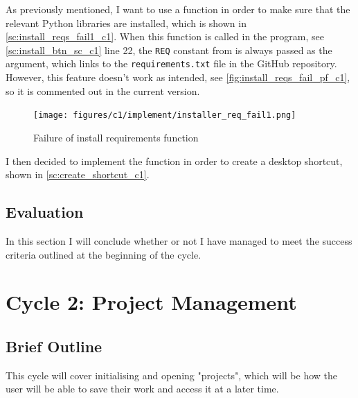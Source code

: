 \documentclass[11pt]{article}
\begin{document}
            As previously mentioned, I want to use a function in order to make sure that the relevant Python libraries are installed, which is shown in \autoref{sc:install_reqs_fail1_c1}. 
            When this function is called in the program, see \autoref{sc:install_btn_sc_c1} line 22, the \verb|REQ| constant from is always passed as the argument, which links to the \verb|requirements.txt| file in the GitHub repository. However, this feature doesn't work as intended, see \autoref{fig:install_reqs_fail_pf_c1}, so it is commented out in the current version.


            \begin{figure}[!ht]
                \centering
                \texttt{[image: figures/c1/implement/installer\_req\_fail1.png]}
                \caption{Failure of install requirements function}
                \label{fig:install_reqs_fail_pf_c1}
            \end{figure}
            

            I then decided to implement the function in order to create a desktop shortcut, shown in \autoref{sc:create_shortcut_c1}.



        \subsection{Evaluation}
            In this section I will conclude whether or not I have managed to meet the success criteria outlined at the beginning of the cycle. 

    \clearpage
    \section{Cycle 2: Project Management}
        \subsection{Brief Outline}
            This cycle will cover initialising and opening "projects", which will be how the user will be able to save their work and access it at a later time. 
            
\end{document}
